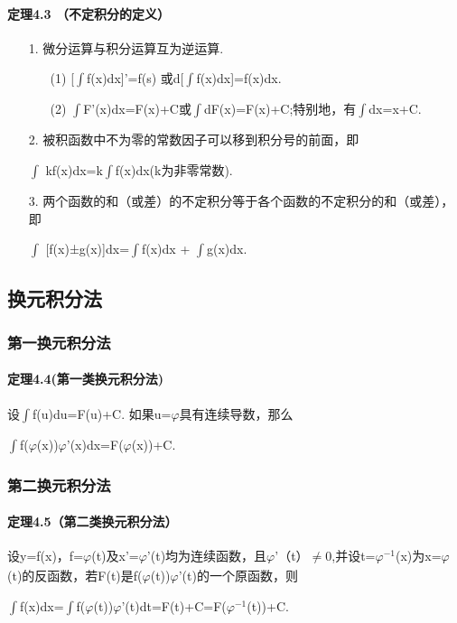 \documentclass[12pt, a4paper, oneside]{ctexart}
\begin{document}
\paragraph{定理4.3 （不定积分的定义）}
\begin{enumerate}
    \item[1.]微分运算与积分运算互为逆运算. \begin{enumerate}
        \item [(1)][$\int $f(x)dx]'=f(s) 或d[$\int $f(x)dx]=f(x)dx.
        \item [(2)]$\int $F'(x)dx=F(x)+C或$\int $dF(x)=F(x)+C;特别地，有$\int $dx=x+C.
    \end{enumerate}
    \item[2.]被积函数中不为零的常数因子可以移到积分号的前面，即
    \begin{center}
        $\int $ kf(x)dx=k$\int $f(x)dx(k为非零常数).
    \end{center}
    \item[3.]两个函数的和（或差）的不定积分等于各个函数的不定积分的和（或差），即
    \begin{center}
        $\int $ [f(x)±g(x)]dx=$\int $f(x)dx + $\int $g(x)dx.
    \end{center}

\end{enumerate}



\subsection{换元积分法}
\vskip 1cm
\subsubsection{第一换元积分法}
\paragraph{定理4.4(第一类换元积分法)}设$\int $f(u)du=F(u)+C. 如果u=$\varphi $具有连续导数，那么
\begin{center}
    $\int $f($\varphi $(x))$\varphi $'(x)dx=F($\varphi $(x))+C.
\end{center}

\vskip 1cm
\subsubsection{第二换元积分法}
\paragraph{定理4.5（第二类换元积分法）}设y=f(x)，f=$\varphi $(t)及x'=$\varphi $'(t)均为连续函数，且$\varphi $'（t）$\neq $0,并设t=$\varphi _{}^{-1}$(x)为x=$\varphi $(t)的反函数，若F(t)是f($\varphi $(t))$\varphi $'(t)的一个原函数，则
\begin{center}
    $\int $f(x)dx=$\int $f($\varphi $(t))$\varphi $'(t)dt=F(t)+C=F($\varphi _{}^{-1}$(t))+C.

\end{center}
\end{document}

